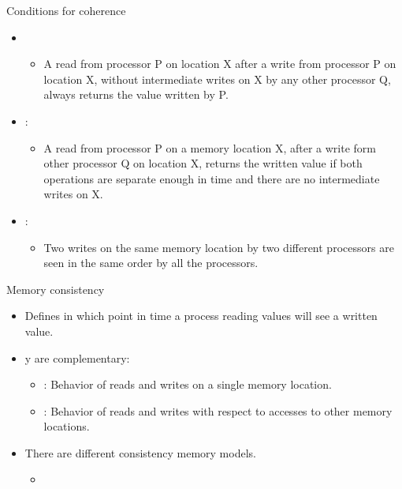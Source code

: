 \begin{frame}[t]{Conditions for coherence}
\begin{itemize}
  \item {}
    \begin{itemize}
      \item A read from processor P on location X
            after a write from processor P on location X,
            without intermediate writes on X by any other processor Q,
            always returns the value written by P.
    \end{itemize}

  \item {}:
    \begin{itemize}
      \item A read from processor P on a memory location X,
            after a write form other processor Q on location X,
            returns the written value
            if both operations are separate enough in time and
            there are no intermediate writes on X.
    \end{itemize}

  \item {}:
    \begin{itemize}
      \item Two writes on the same memory location by two different processors
            are seen in the same order by all the processors.
    \end{itemize}

\end{itemize}
\end{frame}

\begin{frame}[t]{Memory consistency}
\begin{itemize}
  \item Defines in which point in time a process reading values will see a written value.

  \item {} y  are complementary:
    \begin{itemize}
      \item {}: 
            Behavior of reads and writes on a single memory location.
      \item {}: 
            Behavior of reads and writes with respect to accesses to other memory locations.
    \end{itemize}

  \item There are different consistency memory models.
    \begin{itemize}
      \item {}
    \end{itemize}

\end{itemize}
\end{frame}
